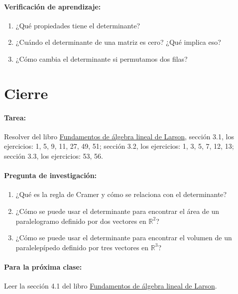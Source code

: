 \documentclass[a4,11pt]{aleph-notas}
\begin{document}
\paragraph{Verificación de aprendizaje:}
\begin{enumerate}[leftmargin=*]
    \item ¿Qué propiedades tiene el determinante?
    \item ¿Cuándo el determinante de una matriz es cero? ¿Qué implica eso?
    \item ¿Cómo cambia el determinante si permutamos dos filas?
\end{enumerate}

\section*{Cierre}

\paragraph{Tarea:}
Resolver del libro \href{https://catalogobiblioteca.puce.edu.ec/cgi-bin/koha/opac-detail.pl?biblionumber=86081}{Fundamentos de álgebra lineal de Larson}, sección 3.1, los ejercicios: 1, 5, 9, 11, 27, 49, 51; sección 3.2, los ejercicios: 1, 3, 5, 7, 12, 13; sección 3.3, los ejercicios: 53, 56.

\paragraph{Pregunta de investigación:}
\begin{enumerate}[leftmargin=*]
    \item ¿Qué es la regla de Cramer y cómo se relaciona con el determinante?
    \item ¿Cómo se puede usar el determinante para encontrar el área de un paralelogramo definido por dos vectores en $\mathbb{R}^2$?
    \item ¿Cómo se puede usar el determinante para encontrar el volumen de un paralelepípedo definido por tres vectores en $\mathbb{R}^3$?
\end{enumerate}

\paragraph{Para la próxima clase:}  
Leer la sección 4.1 del libro \href{https://catalogobiblioteca.puce.edu.ec/cgi-bin/koha/opac-detail.pl?biblionumber=86081}{Fundamentos de álgebra lineal de Larson}.
\end{document}

